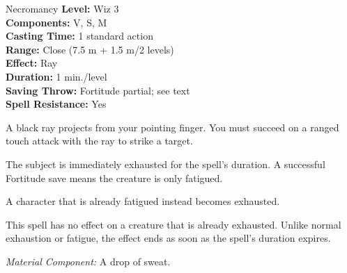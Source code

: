 {Necromancy}
{
	\textbf{Level:}
	Wiz 3\\
	\textbf{Components:}
	V, S, M\\
	\textbf{Casting Time:}
	1 standard action\\
	\textbf{Range:}
	Close (7.5 m + 1.5 m/2 levels)\\
	\textbf{Effect:}
	Ray\\
	\textbf{Duration:}
	1 min./level\\
	\textbf{Saving Throw:}
	Fortitude partial; see text\\
	\textbf{Spell Resistance:}
	Yes\\
}
{
	A black ray projects from your pointing finger. You must succeed on a ranged touch attack with the ray to strike a target.

	The subject is immediately exhausted for the spell's duration. A successful Fortitude save means the creature is only fatigued.

	A character that is already fatigued instead becomes exhausted.

	This spell has no effect on a creature that is already exhausted. Unlike normal exhaustion or fatigue, the effect ends as soon as the spell's duration expires.

	\textit{Material Component:}
	A drop of sweat.

}
